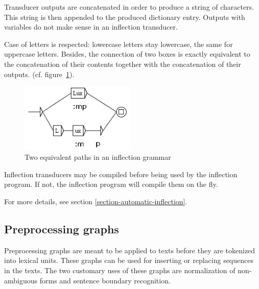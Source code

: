 \bigskip
\noindent Transducer outputs are concatenated in order to produce a string of
characters. This string is then appended to the produced dictionary entry.
Outputs with variables do not make sense in an inflection transducer.

\bigskip
\noindent Case of letters is respected: lowercase letters stay lowercase, 
the same for uppercase letters. Besides,
the connection of two boxes is exactly equivalent to the concatenation of their
contents together with the concatenation of their outputs.
(cf.
figure~\ref{fig-equivalent-inflection-paths}).

\bigskip
\begin{figure}[!h]
\begin{center}
\includegraphics[width=5.5cm]{resources/img/fig6-2.png}
\caption{Two equivalent paths in an inflection grammar\label{fig-equivalent-inflection-paths}}
\end{center}
\end{figure}

\bigskip
\noindent Inflection transducers may be compiled before being used by the
inflection program. If not, the inflection program will compile them on the fly.

\bigskip
\noindent For more details, see section
\ref{section-automatic-inflection}.

\subsection{Preprocessing graphs}
Preprocessing graphs are meant to be applied to texts before they are
tokenized into lexical units. These graphs can be used for inserting or
replacing sequences in the texts. The two customary uses of these graphs are
normalization of non-ambiguous forms and sentence boundary recognition.

